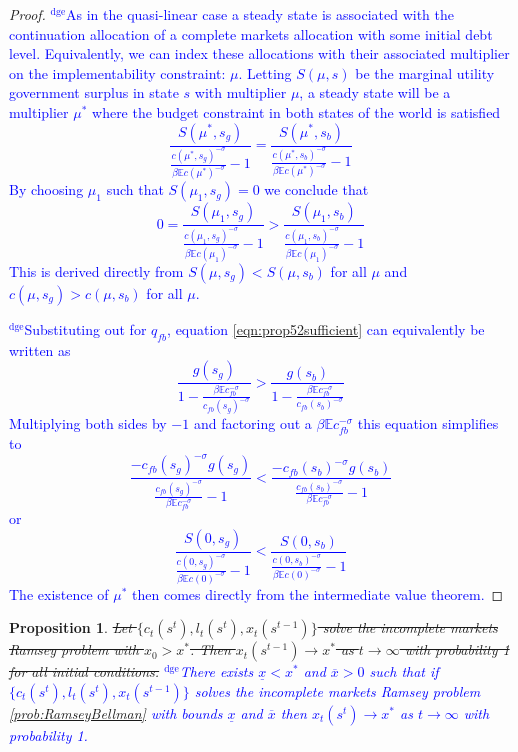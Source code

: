 \documentclass[12pt]{article}
\newcommand{\dge}[1]{\textcolor{blue}{$^{\textrm{dge}}${#1}}}
\newcommand{\EE}{\mathbb E}
\newtheorem{proposition}[theorem]{Proposition}
\begin{document}
\begin{proof}\dge{As in the quasi-linear case a steady state is associated with the continuation allocation of a complete markets allocation with some initial debt level.  Equivalently, we can index these allocations with their associated multiplier on the implementability constraint: $\mu$.  Letting $S(\mu,s)$ be the marginal utility government surplus in state $s$ with multiplier $\mu$, a steady state will be a multiplier $\mu^*$ where the budget constraint in both states of the world is satisfied 
\[
	\frac{S(\mu^*,s_g)}{\frac{c(\mu^*,s_g)^{-\sigma}}{\beta \EE c(\mu^*)^{-\sigma}}-1} =\frac{S(\mu^*,s_b)}{\frac{c(\mu^*,s_b)^{-\sigma}}{\beta \EE c(\mu^*)^{-\sigma}}-1}
\]  By choosing $\mu_1$ such that $S(\mu_1,s_g) =0$ we conclude that 
\[
	0 = \frac{S(\mu_1,s_g)}{\frac{c(\mu_1,s_g)^{-\sigma}}{\beta \EE c(\mu_1)^{-\sigma}}-1} > \frac{S(\mu_1,s_b)}{\frac{c(\mu_1,s_b)^{-\sigma}}{\beta \EE c(\mu_1)^{-\sigma}}-1}
\]  This is derived directly from $S(\mu,s_g) < S(\mu,s_b)$ for all $\mu$ and $c(\mu,s_g) > c(\mu,s_b)$ for all $\mu$. }

\dge{Substituting out for $q_{fb}$, equation \eqref{eqn:prop52sufficient} can equivalently be written as
\[
	\frac{g(s_g)}{1-\frac{\beta\EE c_{fb}^{-\sigma}}{c_{fb}(s_g)^{-\sigma}}} > \frac{g(s_b)}{1-\frac{\beta\EE c_{fb}^{-\sigma}}{c_{fb}(s_b)^{-\sigma}}}
\]  Multiplying both sides by $-1$ and factoring out a $\beta\EE c_{fb}^{-\sigma}$ this equation simplifies to 
\[
	\frac{-c_{fb}(s_g)^{-\sigma}g(s_g) }{\frac{c_{fb}(s_g)^{-\sigma}}{\beta \EE c_{fb}^{-\sigma}}-1} < \frac{-c_{fb}(s_b)^{-\sigma}g(s_b) }{\frac{c_{fb}(s_b)^{-\sigma}}{\beta \EE c_{fb}^{-\sigma}}-1}
\]or 
\[
	\frac{S(0,s_g)}{\frac{c(0,s_g)^{-\sigma}}{\beta \EE c(0)^{-\sigma}}-1} <\frac{S(0,s_b)}{\frac{c(0,s_b)^{-\sigma}}{\beta \EE c(0)^{-\sigma}}-1}
\]  The existence of $\mu^*$ then comes directly from the intermediate value theorem.}
\end{proof}


	\begin{proposition} \st{ Let $\{c_t(s^t), l_t(s^t), x_t(s^{t-1})\}$ solve the incomplete markets Ramsey problem with $x_0 > x^*$.  Then  $x_t(s^{t-1})\rightarrow x^*$ as $t\rightarrow \infty$ with probability 1 for all initial conditions.}  \dge{There exists $\underline x < x^*$ and $\overline x >0$ such that if $\{c_t(s^t), l_t(s^t), x_t(s^{t-1})\}$ solves the incomplete markets Ramsey problem \ref{prob:RamseyBellman} with bounds $\underline x$ and $\overline x$ then $x_t(s^t)\rightarrow x^*$ as $t\rightarrow\infty$ with probability 1.}
	
	\end{proposition}
\end{document}
